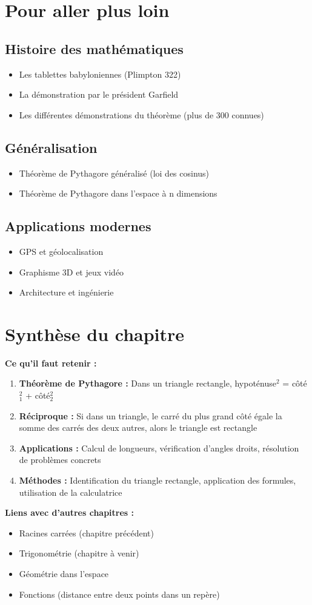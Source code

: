 \section{Pour aller plus loin}

\subsection{Histoire des mathématiques}
\begin{itemize}
    \item Les tablettes babyloniennes (Plimpton 322)
    \item La démonstration par le président Garfield
    \item Les différentes démonstrations du théorème (plus de 300 connues)
\end{itemize}

\subsection{Généralisation}
\begin{itemize}
    \item Théorème de Pythagore généralisé (loi des cosinus)
    \item Théorème de Pythagore dans l'espace à n dimensions
\end{itemize}

\subsection{Applications modernes}
\begin{itemize}
    \item GPS et géolocalisation
    \item Graphisme 3D et jeux vidéo
    \item Architecture et ingénierie
\end{itemize}

\section{Synthèse du chapitre}

\textbf{Ce qu'il faut retenir :}

\begin{enumerate}
    \item \textbf{Théorème de Pythagore :} Dans un triangle rectangle, hypoténuse$^2$ = côté$_1^2$ + côté$_2^2$
    \item \textbf{Réciproque :} Si dans un triangle, le carré du plus grand côté égale la somme des carrés des deux autres, alors le triangle est rectangle
    \item \textbf{Applications :} Calcul de longueurs, vérification d'angles droits, résolution de problèmes concrets
    \item \textbf{Méthodes :} Identification du triangle rectangle, application des formules, utilisation de la calculatrice
\end{enumerate}

\textbf{Liens avec d'autres chapitres :}
\begin{itemize}
    \item Racines carrées (chapitre précédent)
    \item Trigonométrie (chapitre à venir)
    \item Géométrie dans l'espace
    \item Fonctions (distance entre deux points dans un repère)
\end{itemize} 